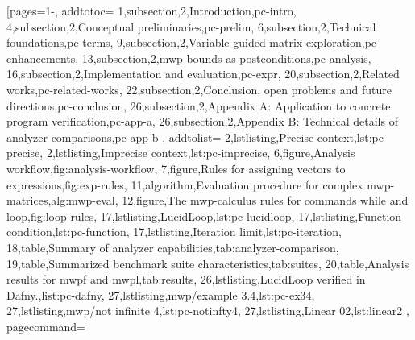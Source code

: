 \pageIconFm
{}
[pages={1-},
    addtotoc={
        1,subsection,2,{Introduction},pc-intro,
        4,subsection,2,{Conceptual preliminaries},pc-prelim,
        6,subsection,2,{Technical foundations},pc-terms,
        9,subsection,2,{Variable-guided matrix exploration},pc-enhancements,
        13,subsection,2,{mwp-bounds as postconditions},pc-analysis,
        16,subsection,2,{Implementation and evaluation},pc-expr,
        20,subsection,2,{Related works},pc-related-works,
        22,subsection,2,{Conclusion, open problems and future directions},pc-conclusion,
        26,subsection,2,{Appendix A: Application to concrete program verification},pc-app-a,
        26,subsection,2,{Appendix B: Technical details of analyzer comparisons},pc-app-b
    }, addtolist={
        2,lstlisting,{Precise context},lst:pc-precise,
        2,lstlisting,{Imprecise context},lst:pc-imprecise,
        6,figure,{Analysis workflow},fig:analysis-workflow,
        7,figure,{Rules for assigning vectors to expressions},fig:exp-rules,
        11,algorithm,{Evaluation procedure for complex mwp-matrices},alg:mwp-eval,
        12,figure,{The mwp-calculus rules for commands while and loop},fig:loop-rules,
        17,lstlisting,{LucidLoop},lst:pc-lucidloop,
        17,lstlisting,{Function condition},lst:pc-function,
        17,lstlisting,{Iteration limit},lst:pc-iteration,
        18,table,{Summary of analyzer capabilities},tab:analyzer-comparison,
        19,table,{Summarized benchmark suite characteristics},tab:suites,
        20,table,{Analysis results for mwpf and mwpl},tab:results,
        26,lstlisting,{LucidLoop verified in Dafny.},list:pc-dafny,
        27,lstlisting,{mwp/example 3.4},lst:pc-ex34,
        27,lstlisting,{mwp/not infinite 4},lst:pc-notinfty4,
        27,lstlisting,{Linear 02},lst:linear2
    }, pagecommand={\thispagestyle{empty}%
}
